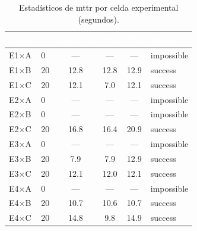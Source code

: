 \documentclass[../main.tex]{subfiles}
\begin{document}
\begin{table}[ht]
  \centering
  \begin{tabular}{C{1.8cm} C{0.8cm} S[table-format=3.1] S[table-format=2.1] S[table-format=3.1] l}
    \toprule
    \textcolor{white}{\textbf{Celda}} &
    \textcolor{white}{\textbf{$n$}} &
    \textcolor{white}{\textbf{Med. (s)}} &
    \textcolor{white}{\textbf{P25}} &
    \textcolor{white}{\textbf{P75}} &
    \textcolor{white}{\textbf{Status}} \\
    \midrule
    E1$\times$A &  0 & {---} & {---} & {---}  & impossible \\
    E1$\times$B & 20 &  12.8 &  12.8 &  12.9  & success \\
    E1$\times$C & 20 &  12.1 &   7.0 &  12.1  & success \\
    E2$\times$A &  0 & {---} & {---} & {---}  & impossible \\
    E2$\times$B &  0 & {---} & {---} & {---}  & impossible \\
    E2$\times$C & 20 &  16.8 &  16.4 &  20.9  & success \\
    E3$\times$A &  0 & {---} & {---} & {---}  & impossible \\
    E3$\times$B & 20 &   7.9 &   7.9 &  12.9  & success \\
    E3$\times$C & 20 &  12.1 &  12.0 &  12.1  & success \\
    E4$\times$A &  0 & {---} & {---} & {---}  & impossible \\
    E4$\times$B & 20 &  10.7 &  10.6 &  10.7  & success \\
    E4$\times$C & 20 &  14.8 &   9.8 &  14.9  & success \\
    \bottomrule
  \end{tabular}
  \caption{Estadísticos de \gls{mttr} por celda experimental (segundos).}
  \label{tab:mttr}
\end{table}
\end{document}
